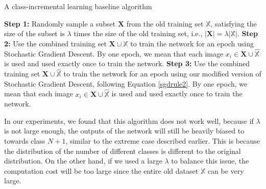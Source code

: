 \begin{algorithm}
	\caption{A class-incremental learning baseline algorithm}
	\label{algo:baseline}
	\begin{algorithmic}
		\State \textbf{Step 1:} Randomly sample a subset $\mathbf{X}$ from the old training set $\mathbb{X}$, satisfying the size of the subset is $\lambda$ times the size of the old training set, i.e., $|\mathbf{X}| = \lambda|\mathbb{X}|$.
		\State \textbf{Step 2:} Use the combined training set $\mathbf{X} \cup \hat{\mathbb{X}}$ to train the network for an epoch using Stochastic Gradient Descent. By one epoch, we mean that each image $x_i \in \mathbf{X} \cup \hat{\mathbb{X}}$ is used and used exactly once to train the network.
		\State \textbf{Step 3:} Use the combined training set $\mathbf{X} \cup \hat{\mathbb{X}}$ to train the network for an epoch using our modified version of Stochastic Gradient Descent, following Equation \ref{sgdrule2}. By one epoch, we mean that each image $x_i \in \mathbf{X} \cup \hat{\mathbb{X}}$ is used and used exactly once to train the network.
		\EndFor
	\end{algorithmic}
\end{algorithm}

In our experiments, we found that this algorithm does not work well, because if $\lambda$ is not large enough, the outputs of the network will still be heavily biased to towards class $N+1$, similar to the extreme case described earlier. This is because the distribution of the number of different classes is different to the original distribution. On the other hand, if we used a large $\lambda$ to balance this issue, the computation cost will be too large since the entire old dataset $\mathbb{X}$ can be very large.

